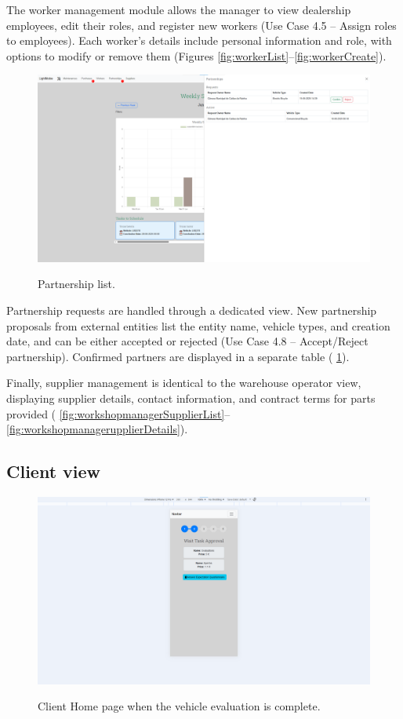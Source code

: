 The worker management module allows the manager to view dealership employees, edit their roles, and register new workers (Use Case 4.5 – Assign roles to employees). Each worker's details include personal information and role, with options to modify or remove them (Figures \ref{fig:workerList}–\ref{fig:workerCreate}).


\begin{figure}[h]
  \caption{Partnership list.}
  \centering
  \includegraphics[width=\textwidth]{figs/Implementation/workshopmanager/partnershipList}
  \label{fig:partnershipList}
\end{figure}


Partnership requests are handled through a dedicated view. New partnership proposals from external entities list the entity name, vehicle types, and creation date, and can be either accepted or rejected (Use Case 4.8 – Accept/Reject partnership). Confirmed partners are displayed in a separate table ( \ref{fig:partnershipList}).

Finally, supplier management is identical to the warehouse operator view, displaying supplier details, contact information, and contract terms for parts provided ( \ref{fig:workshopmanagerSupplierList}–\ref{fig:workshopmanagerupplierDetails}).



\subsection{Client view}

\begin{figure}[h]
  \caption{Client Home page when the vehicle evaluation is complete.}
  \centering
  \includegraphics[width=\textwidth]{figs/Implementation/client/MaintenanceState2}
  \label{fig:MaintenanceState2}
\end{figure}


